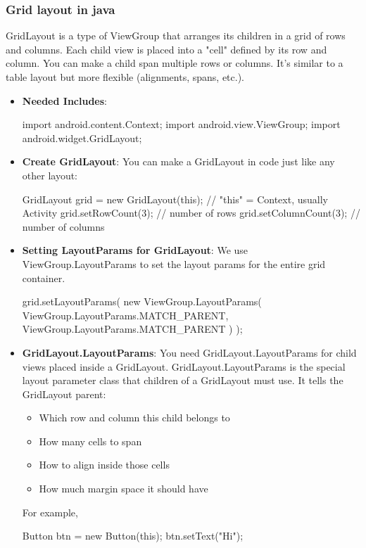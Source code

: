 \documentclass{report}
\begin{document}
    \subsubsection{Grid layout in java}
    \bigbreak \noindent 
    GridLayout is a type of ViewGroup that arranges its children in a grid of rows and columns.
    \bigbreak \noindent 
    Each child view is placed into a "cell" defined by its row and column. You can make a child span multiple rows or columns. It’s similar to a table layout but more flexible (alignments, spans, etc.).
    \begin{itemize}
        \item \textbf{Needed Includes}:
            \bigbreak \noindent 
            \begin{javacode}
                import android.content.Context;
                import android.view.ViewGroup;
                import android.widget.GridLayout;
            \end{javacode}
        \item \textbf{Create GridLayout}: You can make a GridLayout in code just like any other layout:
            \bigbreak \noindent 
            \begin{javacode}
                GridLayout grid = new GridLayout(this);   // "this" = Context, usually Activity
                grid.setRowCount(3);                      // number of rows
                grid.setColumnCount(3);                   // number of columns
            \end{javacode}
        \item \textbf{Setting LayoutParams for GridLayout}: We use ViewGroup.LayoutParams to set the layout params for the entire grid container.
            \bigbreak \noindent 
            \begin{javacode}
                grid.setLayoutParams(
                    new ViewGroup.LayoutParams(
                        ViewGroup.LayoutParams.MATCH_PARENT,
                        ViewGroup.LayoutParams.MATCH_PARENT
                    )
                );
            \end{javacode}
            
        \item \textbf{GridLayout.LayoutParams}: You need GridLayout.LayoutParams for child views placed inside a GridLayout. GridLayout.LayoutParams is the special layout parameter class that children of a GridLayout must use.
            \bigbreak \noindent 
         It tells the GridLayout parent:
            \begin{itemize}
                \item Which row and column this child belongs to
                \item How many cells to span
                \item How to align inside those cells
                \item How much margin space it should have
            \end{itemize}
            For example,
            \bigbreak \noindent 
            \begin{javacode}
                Button btn = new Button(this);
                btn.setText("Hi");


\end{javacode}
\end{itemize}
\end{document}
